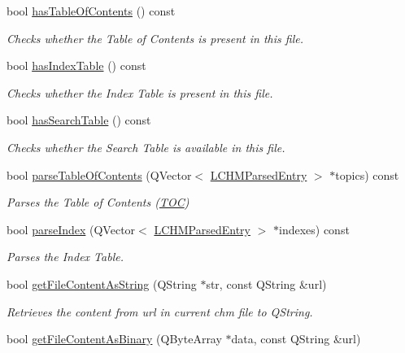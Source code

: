 \begin{DoxyCompactItemize}
bool \hyperlink{classLCHMFile_a10c31294cb99483b4a9dca8dcc3a7a34}{has\+Table\+Of\+Contents} () const 
\begin{DoxyCompactList}\small\item\em Checks whether the Table of Contents is present in this file. \end{DoxyCompactList}\item 
bool \hyperlink{classLCHMFile_a47c6e4a787c33ebad3556d7b1fd89738}{has\+Index\+Table} () const 
\begin{DoxyCompactList}\small\item\em Checks whether the Index Table is present in this file. \end{DoxyCompactList}\item 
bool \hyperlink{classLCHMFile_a7a2cdadc94e6804bc05f99b19842bed1}{has\+Search\+Table} () const 
\begin{DoxyCompactList}\small\item\em Checks whether the Search Table is available in this file. \end{DoxyCompactList}\item 
bool \hyperlink{classLCHMFile_a28d69103c40a289a41ef8f56e5f63eca}{parse\+Table\+Of\+Contents} (Q\+Vector$<$ \hyperlink{structLCHMParsedEntry}{L\+C\+H\+M\+Parsed\+Entry} $>$ $\ast$topics) const 
\begin{DoxyCompactList}\small\item\em Parses the Table of Contents (\hyperlink{classTOC}{T\+O\+C}) \end{DoxyCompactList}\item 
bool \hyperlink{classLCHMFile_ad93af373778e2460fa0f667b9731e76d}{parse\+Index} (Q\+Vector$<$ \hyperlink{structLCHMParsedEntry}{L\+C\+H\+M\+Parsed\+Entry} $>$ $\ast$indexes) const 
\begin{DoxyCompactList}\small\item\em Parses the Index Table. \end{DoxyCompactList}\item 
bool \hyperlink{classLCHMFile_a676da6f5d866c297977a5c521805af45}{get\+File\+Content\+As\+String} (Q\+String $\ast$str, const Q\+String \&url)
\begin{DoxyCompactList}\small\item\em Retrieves the content from url in current chm file to Q\+String. \end{DoxyCompactList}\item 
bool \hyperlink{classLCHMFile_ab3b176b6cd5794321fa7fef44c85db86}{get\+File\+Content\+As\+Binary} (Q\+Byte\+Array $\ast$data, const Q\+String \&url)

\end{DoxyCompactItemize}

